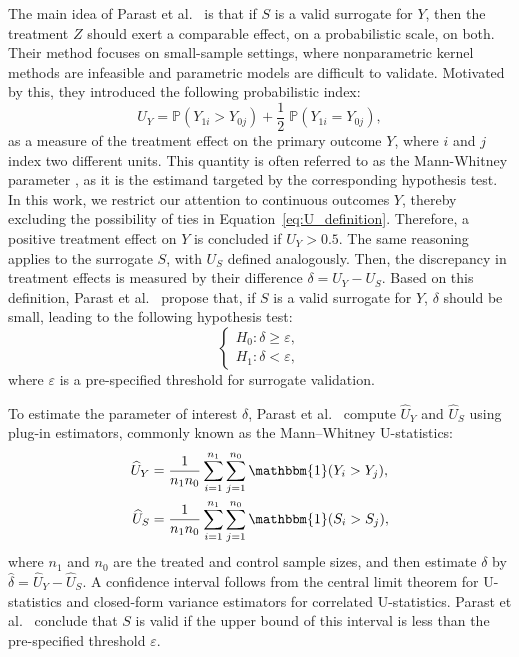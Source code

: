 \documentclass[12pt]{article}
\newcommand{\Prob}{\mathbb{P}}
\newcommand{\one}{\mathbbm{1}}
\begin{document}
The main idea of Parast et al.\ \citep{parast2024rank} is that if \(S\) is a valid surrogate for \(Y\), then the treatment \(Z\) should exert a comparable effect, on a probabilistic scale, on both. Their method focuses on small-sample settings, where nonparametric kernel methods are infeasible and parametric models are difficult to validate. Motivated by this, they introduced the following probabilistic index:
\begin{equation}
  \label{eq:U_definition}
  U_{Y} = \Prob(Y_{1i} > Y_{0j}) + \frac{1}{2} \; \Prob(Y_{1i} = Y_{0j}),
\end{equation}
as a measure of the treatment effect on the primary outcome \(Y\), where \(i\) and \(j\) index two different units. This quantity is often referred to as the Mann-Whitney parameter \citep{mann1947test, thas2012probabilistic, hoeffding1992class, buyse2010generalized}, as it is the estimand targeted by the corresponding hypothesis test. In this work, we restrict our attention to continuous outcomes \(Y\), thereby excluding the possibility of ties in Equation~\eqref{eq:U_definition}. Therefore, a positive treatment effect on \(Y\) is concluded if \(U_{Y} > 0.5\). The same reasoning applies to the surrogate \(S\), with \(U_{S}\) defined analogously. Then, the discrepancy in treatment effects is measured by their difference \(\delta = U_{Y} - U_{S}\). Based on this definition, Parast et al.\ \citep{parast2024rank} propose that, if \(S\) is a valid surrogate for \(Y\), \(\delta\) should be small, leading to the following hypothesis test:
\begin{equation}
  \label{eq:hypothesis_test_delta}
  \begin{cases}
    H_{0}: \delta \geq \varepsilon, \\
    H_{1}: \delta < \varepsilon,
  \end{cases}
\end{equation}
where \(\varepsilon\) is a pre-specified threshold for surrogate validation.

To estimate the parameter of interest \(\delta\), Parast et al.\ \citep{parast2024rank} compute \(\widehat{U}_{Y}\) and \(\widehat{U}_{S}\) using plug-in estimators, commonly known as the Mann--Whitney U-statistics:
\begin{equation}
  \label{eq:U_estimator}
  \begin{aligned}
    \widehat{U}_{Y} & = \frac{1}{n_{1} n_{0}} \sum^{n_{1}}_{i = 1} \sum^{n_{0}}_{j = 1} \one(Y_{i} > Y_{j}), \\
    \widehat{U}_{S} & = \frac{1}{n_{1} n_{0}} \sum^{n_{1}}_{i = 1} \sum^{n_{0}}_{j = 1} \one(S_{i} > S_{j}),
  \end{aligned}
\end{equation}
where \(n_{1}\) and \(n_{0}\) are the treated and control sample sizes, and then estimate \(\delta\) by \(\widehat{\delta} = \widehat{U}_{Y} - \widehat{U}_{S}\). A confidence interval follows from the central limit theorem for U-statistics and closed-form variance estimators for correlated U-statistics. Parast et al.\ \citep{parast2024rank} conclude that \(S\) is valid if the upper bound of this interval is less than the pre-specified threshold \(\varepsilon\).
\end{document}
